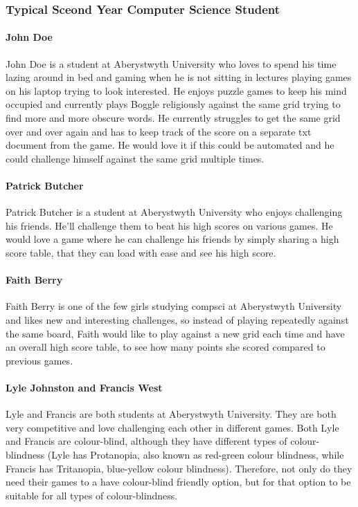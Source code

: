 \documentclass{project}
\begin{document}
	\subsubsection{Typical Sceond Year Computer Science Student}
		\paragraph{John Doe}
			John Doe is a student at Aberystwyth University who loves to spend his time lazing around in bed and gaming when he is not sitting in lectures playing games on his laptop trying to look interested. He enjoys puzzle games to keep his mind occupied and currently plays Boggle religiously against the same grid trying to find more and more obscure words. He currently struggles to get the same grid over and over again and has to keep track of the score on a separate txt document from the game. He would love it if this could be automated and he could challenge himself against the same grid multiple times.
		\paragraph{Patrick Butcher}
			Patrick Butcher is a student at Aberystwyth University who enjoys challenging his friends. He'll challenge them to beat his high scores on various games. He would love a game where he can challenge his friends by simply sharing a high score table, that they can load with ease and see his high score.
		\paragraph{Faith Berry}
			Faith Berry is one of the few girls studying compsci at Aberystwyth University and likes new and interesting challenges, so instead of playing repeatedly against the same board, Faith would like to play against a new grid each time and have an overall high score table, to see how many points she scored compared to previous games.
		\paragraph{Lyle Johnston and Francis West}
		    Lyle and Francis are both students at Aberystwyth University. They are both very competitive and love challenging each other in different games. Both Lyle and Francis are colour-blind, although they have different types of colour-blindness (Lyle has Protanopia, also known as red-green colour blindness, while Francis has Tritanopia, blue-yellow colour blindness). Therefore, not only do they need their games to a have colour-blind friendly option, but for that option to be suitable for all types of colour-blindness.
\end{document}

